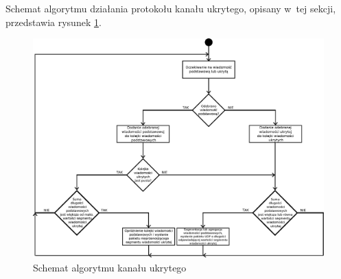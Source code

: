 \documentclass[a4paper, twoside, openright, 12pt]{report}
\begin{document}
    Schemat algorytmu działania protokołu kanału ukrytego, opisany w~tej sekcji,
    przedstawia rysunek \ref{CHANNELALGORITHM}.

        \begin{figure}[tp]
                \centering
                \includegraphics[scale=0.60, angle=90]{algorytm_kanalu_ukrytego}
                \caption{Schemat algorytmu kanału ukrytego}
                \label{CHANNELALGORITHM}
        \end{figure}
\end{document}
